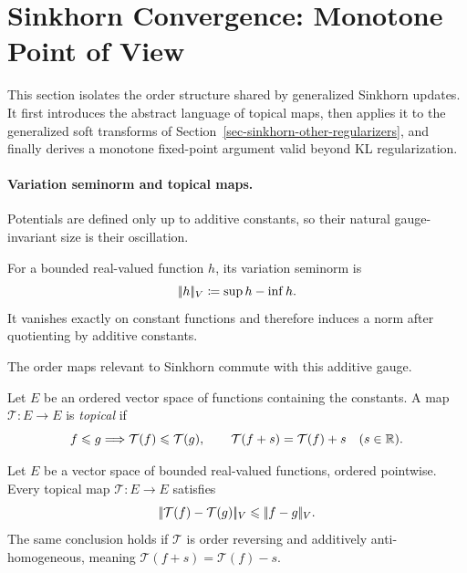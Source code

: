 \section{Sinkhorn Convergence: Monotone Point of View}\label{sec-sinkhorn-monotone}

This section isolates the order structure shared by generalized Sinkhorn updates. It first introduces the abstract language of topical maps, then applies it to the generalized soft transforms of Section~\ref{sec-sinkhorn-other-regularizers}, and finally derives a monotone fixed-point argument valid beyond KL regularization.

\paragraph{Variation seminorm and topical maps.}
Potentials are defined only up to additive constants, so their natural gauge-invariant size is their oscillation.

\begin{defn}\label{def-variation-seminorm}
	For a bounded real-valued function $h$, its variation seminorm is
	\[
		|\!| h |\!|_V\coloneqq \sup h-\inf h.
	\]
	It vanishes exactly on constant functions and therefore induces a norm after quotienting by additive constants.
\end{defn}

The order maps relevant to Sinkhorn commute with this additive gauge.
\begin{defn}\label{def-topical-map}
	Let $E$ be an ordered vector space of functions containing the constants. A map $\mathcal T:E\to E$ is \emph{topical} if
	\[
		f\leqslant g\Longrightarrow\mathcal T(f)\leqslant\mathcal T(g),
		\qquad
		\mathcal T(f+s)=\mathcal T(f)+s
		\quad(s\in\mathbb{R}).
	\]
\end{defn}

\begin{prop}\label{prop-topical-variation-nonexpansive}
	Let $E$ be a vector space of bounded real-valued functions, ordered pointwise. Every topical map $\mathcal T:E\to E$ satisfies
	\[
		|\!| \mathcal T(f)-\mathcal T(g) |\!|_V
		\leqslant
		|\!| f-g |\!|_V.
	\]
	The same conclusion holds if $\mathcal T$ is order reversing and additively anti-homogeneous, meaning $\mathcal T(f+s)=\mathcal T(f)-s$.
\end{prop}


